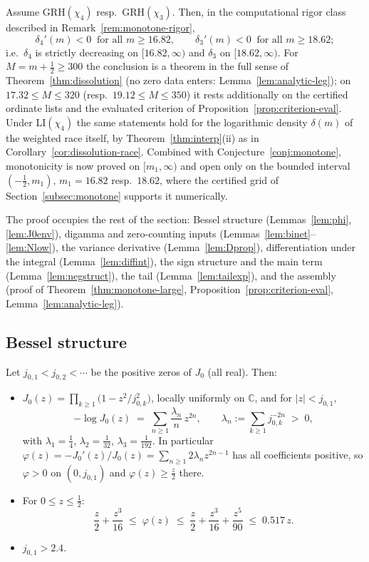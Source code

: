 \begin{corollary}[explicit thresholds for $q=4,3$]
\label{cor:monotone-explicit}
Assume GRH$(\chi_4)$ resp.\ GRH$(\chi_3)$. Then, in the computational
rigor class described in Remark~\ref{rem:monotone-rigor},
\[
\delta_4'(m)<0\ \text{ for all } m\ge16.82,
\qquad
\delta_3'(m)<0\ \text{ for all } m\ge18.62 ;
\]
i.e.\ $\delta_4$ is strictly decreasing on $[16.82,\infty)$ and
$\delta_3$ on $[18.62,\infty)$. For $M=m+\tfrac12\ge300$ the
conclusion is a theorem in the full sense of
Theorem~\ref{thm:dissolution} (no zero data enters:
Lemma~\ref{lem:analytic-leg}); on $17.32\le M\le320$ (resp.\
$19.12\le M\le350$) it rests additionally on the certified ordinate
lists and the evaluated criterion of
Proposition~\ref{prop:criterion-eval}. Under LI$(\chi_4)$ the same
statements hold for the logarithmic density $\delta(m)$ of the
weighted race itself, by Theorem~\ref{thm:interp}(ii) as in
Corollary~\ref{cor:dissolution-race}. Combined with
Conjecture~\ref{conj:monotone}, monotonicity is now proved on
$[m_1,\infty)$ and open only on the bounded interval
$(-\tfrac12,m_1)$, $m_1=16.82$ resp.\ $18.62$, where the certified
grid of Section~\ref{subsec:monotone} supports it numerically.
\end{corollary}

The proof occupies the rest of the section: Bessel structure
(Lemmas~\ref{lem:phi}, \ref{lem:J0env}), digamma and zero-counting
inputs (Lemmas~\ref{lem:binet}--\ref{lem:Nlow}), the variance
derivative (Lemma~\ref{lem:Dprop}), differentiation under the
integral (Lemma~\ref{lem:diffint}), the sign structure and the main
term (Lemma~\ref{lem:negstruct}), the tail (Lemma~\ref{lem:tailexp}),
and the assembly (proof of Theorem~\ref{thm:monotone-large},
Proposition~\ref{prop:criterion-eval},
Lemma~\ref{lem:analytic-leg}).

\subsection*{Bessel structure}

\begin{lemma}\label{lem:phi}
Let $j_{0,1}<j_{0,2}<\cdots$ be the positive zeros of $J_0$ (all
real). Then:
\begin{itemize}
\item[(i)] $J_0(z)=\prod_{k\ge1}\bigl(1-z^2/j_{0,k}^2\bigr)$, locally
uniformly on $\mathbb C$, and for $|z|<j_{0,1}$,
\[
-\log J_0(z)\;=\;\sum_{n\ge1}\frac{\lambda_n}{n}\,z^{2n},
\qquad
\lambda_n:=\sum_{k\ge1}j_{0,k}^{-2n}\;>\;0,
\]
with $\lambda_1=\tfrac14$, $\lambda_2=\tfrac1{32}$,
$\lambda_3=\tfrac1{192}$. In particular
$\varphi(z)=-J_0'(z)/J_0(z)=\sum_{n\ge1}2\lambda_nz^{2n-1}$ has all
coefficients positive, so $\varphi>0$ on $(0,j_{0,1})$ and
$\varphi(z)\ge\tfrac z2$ there.
\item[(ii)] For $0\le z\le\tfrac12$:
\[
\frac z2+\frac{z^3}{16}\;\le\;\varphi(z)\;\le\;
\frac z2+\frac{z^3}{16}+\frac{z^5}{90}\;\le\;0.517\,z .
\]
\item[(iii)] $j_{0,1}>2.4$.
\end{itemize}
\end{lemma}

